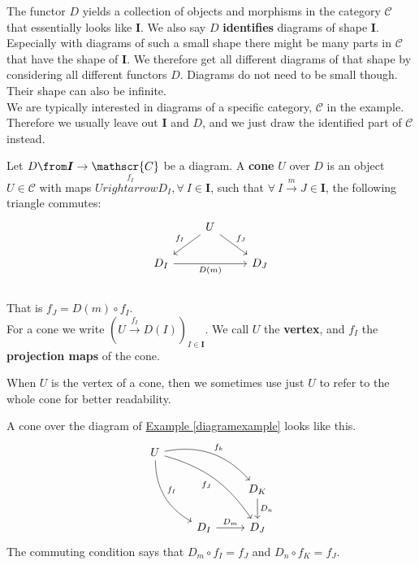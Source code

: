 The functor $D$ yields
a collection of objects and morphisms in the category $\mathscr C$
that essentially looks like $\bm I$.
We also say $D$ \textbf{identifies} diagrams of shape $\bm I$.
Especially with diagrams of such a small shape
there might be many parts in $\mathscr C$ that have the shape of $\bm I$.
We therefore get all different diagrams of that shape by considering
all different functors $D$.
Diagrams do not need to be small though. Their shape can also be infinite.\\
We are typically interested in diagrams of a specific category,
$\mathscr C$ in the example. Therefore we usually leave out $\bm I$ and $D$,
and we just draw the identified part of $\mathscr C$ instead.

\begin{definition}
  Let $D \from \bm{I} \to \mathscr{C}$ be a diagram.
  A \textbf{cone} $U$ over $D$ is an object $U \in \mathscr{C}$
  with maps $U \overset{f_I}{rightarrow} D_I, \forall\ I \in \bm{I}$, such that
  $\forall\ I \overset{m}{\to} J \in \bm{I}$, the following triangle commutes:
  \[
    \begin{tikzcd}
      & U \arrow[dl, swap, "f_I"] \arrow{dr}{f_J}&\\
      D_I \arrow[rr, swap, "D(m)"] & & D_J\\
    \end{tikzcd}
  \]
  That is $f_J = D(m) \circ f_I$.\\
  For a cone we write $(U \overset{f_I}{\to} D(I))_{I\in \bm{I}}$.
  We call $U$ the \textbf{vertex}, and $f_I$ the \textbf{projection maps} of the cone.
\end{definition}
\begin{remark}
  When $U$ is the vertex of a cone, then we sometimes use just $U$ to refer to the whole cone
  for better readability.
\end{remark}
\begin{example}
  A cone over the diagram of
  \hyperref[diagramexample]{Example \ref*{diagramexample}} looks like this.
  \[
    \begin{tikzcd}
      U \arrow[bend right=30]{ddr}{f_I} \arrow[bend left=30]{drr}{f_k} \arrow[bend left=20, swap]{ddrr}{f_J}&   &\\
      & & D_K \arrow{d}{D_n} \\
      & D_I \arrow{r}{D_m} & D_J
    \end{tikzcd}
  \]
  The commuting condition says that $D_m \circ f_I = f_J$ and $D_n \circ f_K = f_J$.
\end{example}


